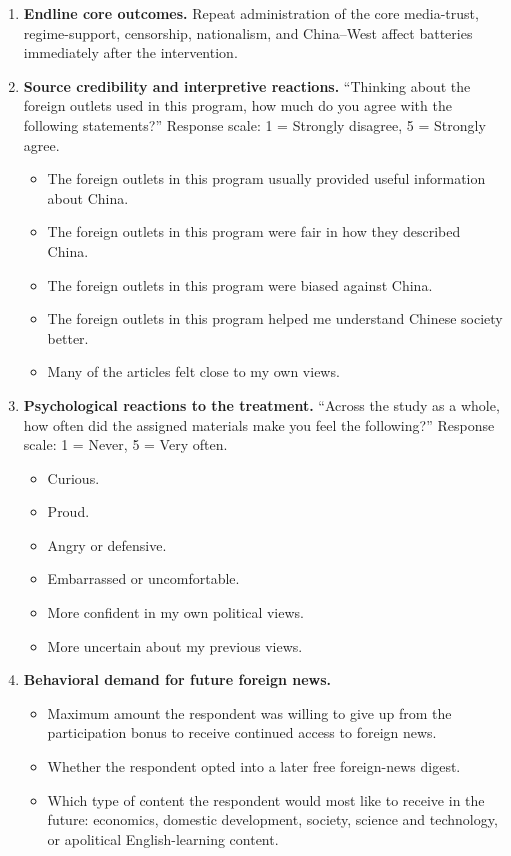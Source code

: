 \documentclass[12pt,american]{article}
\begin{document}
\begin{enumerate}[label=\arabic*., leftmargin=1.5em]
\item \textbf{Endline core outcomes.} Repeat administration of the core media-trust, regime-support, censorship, nationalism, and China--West affect batteries immediately after the intervention.
\item \textbf{Source credibility and interpretive reactions.} ``Thinking about the foreign outlets used in this program, how much do you agree with the following statements?'' Response scale: 1 = Strongly disagree, 5 = Strongly agree.
\begin{itemize}
\item The foreign outlets in this program usually provided useful information about China.
\item The foreign outlets in this program were fair in how they described China.
\item The foreign outlets in this program were biased against China.
\item The foreign outlets in this program helped me understand Chinese society better.
\item Many of the articles felt close to my own views.
\end{itemize}
\item \textbf{Psychological reactions to the treatment.} ``Across the study as a whole, how often did the assigned materials make you feel the following?'' Response scale: 1 = Never, 5 = Very often.
\begin{itemize}
\item Curious.
\item Proud.
\item Angry or defensive.
\item Embarrassed or uncomfortable.
\item More confident in my own political views.
\item More uncertain about my previous views.
\end{itemize}
\item \textbf{Behavioral demand for future foreign news.}
\begin{itemize}
\item Maximum amount the respondent was willing to give up from the participation bonus to receive continued access to foreign news.
\item Whether the respondent opted into a later free foreign-news digest.
\item Which type of content the respondent would most like to receive in the future: economics, domestic development, society, science and technology, or apolitical English-learning content.

\end{itemize}
\end{enumerate}
\end{document}
